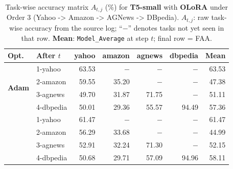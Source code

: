 \begin{table}[ht]
\centering
\caption{%
  Task-wise accuracy matrix $A_{t,j}$ (\%) for \textbf{T5-small} with \textbf{OLoRA} under Order 3 (Yahoo -> Amazon -> AGNews -> DBpedia).
  $A_{t,j}$: raw task-wise accuracy from the source log; ``$-$'' denotes tasks not yet seen in that row.
  \textbf{Mean}: \texttt{Model\_Average} at step $t$; final row = FAA.
}
\label{tab:nlp_o3_t5small_olora}
\setlength{\tabcolsep}{4.0pt}
\renewcommand{\arraystretch}{0.92}
\scriptsize
\begin{tabular}{@{}l l r r r r r@{}}
\toprule
\textbf{Opt.} & \textbf{After $t$} & \textbf{yahoo} & \textbf{amazon} & \textbf{agnews} & \textbf{dbpedia} & \textbf{Mean} \\
\midrule
\multirow{4}{*}{\textbf{Adam}} & 1-yahoo & 63.53 & $-$ & $-$ & $-$ & 63.53 \\
 & 2-amazon & 59.55 & 35.20 & $-$ & $-$ & 47.38 \\
 & 3-agnews & 49.70 & 31.87 & 71.75 & $-$ & 51.11 \\
 & 4-dbpedia & 50.01 & 29.36 & 55.57 & 94.49 & 57.36 \\
\addlinespace[2pt]
\multirow{4}{*}{\textbf{SAM}} & 1-yahoo & 61.47 & $-$ & $-$ & $-$ & 61.47 \\
 & 2-amazon & 56.29 & 33.68 & $-$ & $-$ & 44.99 \\
 & 3-agnews & 52.91 & 32.24 & 71.30 & $-$ & 52.15 \\
 & 4-dbpedia & 50.68 & 29.71 & 57.09 & 94.96 & 58.11 \\
\bottomrule
\end{tabular}
\end{table}
